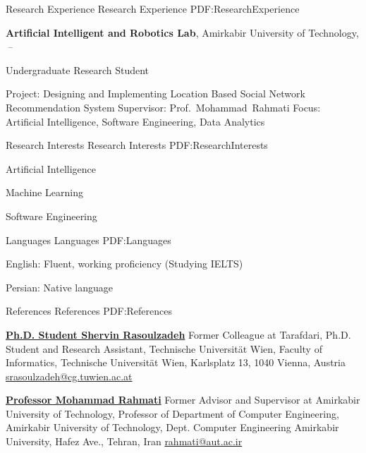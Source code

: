 \documentclass[letterpaper,MMMyyyy,nonstopmode]{resume}
\begin{document}
\begin{Body}

\Section
{Research Experience}
{Research Experience}
{PDF:ResearchExperience}

\Entry
\textbf{Artificial Intelligent and Robotics Lab},
Amirkabir University of Technology,
\hfill
\textsl{\small{\,--\,}}

\Gap
\BulletItem
Undergraduate Research Student
\begin{Detail}
\SubBulletItem
Project:
Designing and Implementing Location Based Social Network Recommendation System
\SubBulletItem
Supervisor:
Prof.~Mohammad~Rahmati
\SubBulletItem
Focus: Artificial Intelligence, Software Engineering, Data Analytics
\end{Detail}


\Section
{Research Interests}
{Research Interests}
{PDF:ResearchInterests}

\BulletItem
Artificial Intelligence

\Gap
\BulletItem
Machine Learning

\Gap
\BulletItem
Software Engineering


\Section
{Languages}
{Languages}
{PDF:Languages}

\BulletItem
English: Fluent, working proficiency (Studying IELTS)

\Gap
\BulletItem
Persian: Native language


\Section
{References}
{References}
{PDF:References}

\BulletItem
\href{https://www.linkedin.com/in/srasoulzadeh}
{\textbf{Ph.D. Student Shervin Rasoulzadeh}}
\newline
Former Colleague at Tarafdari,
\newline
Ph.D. Student and Research Assistant, Technische Universität Wien,
\newline
Faculty of Informatics, Technische Universität Wien, Karlsplatz 13, 1040 Vienna, Austria
\newline
\href{mailto:srasoulzadeh@cg.tuwien.ac.at}
{srasoulzadeh@cg.tuwien.ac.at}

\BigGap
\BulletItem
\href{https://aut.ac.ir/cv/2416/Mohammad-Rahmati?slc_lang=en&&cv=2416&mod=scv}
{\textbf{Professor Mohammad Rahmati}}
\newline
Former Advisor and Supervisor at Amirkabir University of Technology,
\newline
Professor of Department of Computer Engineering, Amirkabir University of Technology,
\newline
Dept. Computer Engineering Amirkabir University, Hafez Ave., Tehran, Iran
\newline
\href{mailto:rahmatiaut.ac.ir}
{rahmati@aut.ac.ir}


\end{Body}
\end{document}
